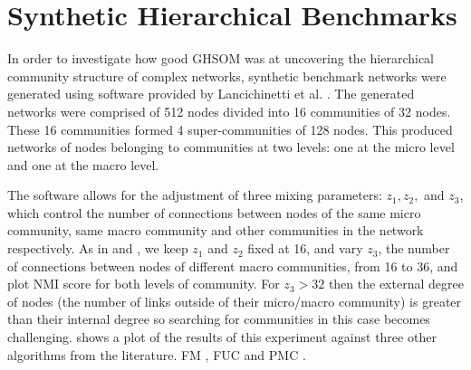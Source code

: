\documentclass{report}
\begin{document}
	\section{Synthetic Hierarchical Benchmarks}
	
	In order to investigate how good GHSOM was at uncovering the hierarchical community structure of complex networks, synthetic benchmark networks were generated using software provided by Lancichinetti et al. \cite{lancichinetti2009detecting}. 
	The generated networks were comprised of 512 nodes divided into 16 communities of 32 nodes. 
	These 16 communities formed 4 super-communities of 128 nodes. 
	This produced networks of nodes belonging to communities at two levels: one at the micro level and one at the macro level.
	
	The software allows for the adjustment of three mixing parameters: $z_1, z_2,$ and $z_3$, which control the number of connections between nodes of the same micro community, same macro community and other communities in the network respectively. 
	As in \cite{lancichinetti2009detecting} and \cite{yang2013hierarchical}, we keep $z_1$ and $z_2$ fixed at 16, and vary $z_3$, the number of connections between nodes of different macro communities, from 16 to 36, and plot NMI score for both levels of community. 
	For $z_3 > 32$ then the external degree of nodes (the number of links outside of their micro/macro community) is greater than their internal degree so searching for communities in this case becomes challenging. 
	 shows a plot of the results of this experiment against three other algorithms from the literature. 
	FM \cite{clauset2004finding}, FUC \cite{blondel2008fast} and PMC \cite{yang2013hierarchical}.
	
\end{document}
